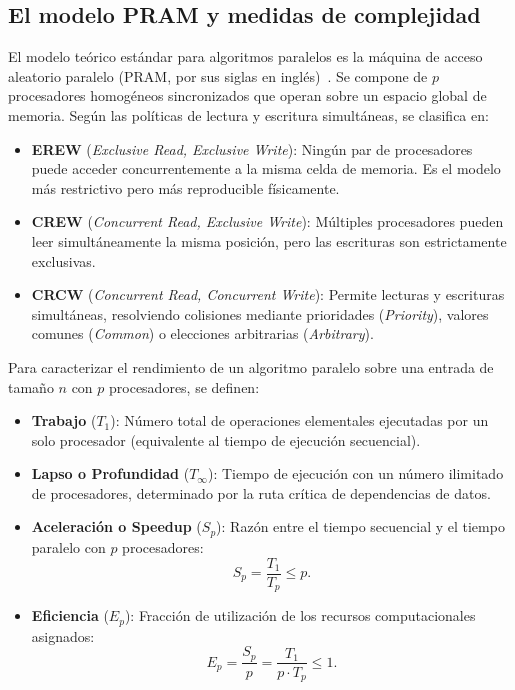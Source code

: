\documentclass[11pt,letterpaper,oneside]{article}
\begin{document}
\subsection{El modelo PRAM y medidas de complejidad}
El modelo teórico estándar para algoritmos paralelos es la máquina de acceso aleatorio paralelo (PRAM, por sus siglas en inglés)~\cite{ja-ja}. Se compone de $p$ procesadores homogéneos sincronizados que operan sobre un espacio global de memoria. Según las políticas de lectura y escritura simultáneas, se clasifica en:
\begin{itemize}
  \item \textbf{EREW} (\emph{Exclusive Read, Exclusive Write}): Ningún par de procesadores puede acceder concurrentemente a la misma celda de memoria. Es el modelo más restrictivo pero más reproducible físicamente.
  \item \textbf{CREW} (\emph{Concurrent Read, Exclusive Write}): Múltiples procesadores pueden leer simultáneamente la misma posición, pero las escrituras son estrictamente exclusivas.
  \item \textbf{CRCW} (\emph{Concurrent Read, Concurrent Write}): Permite lecturas y escrituras simultáneas, resolviendo colisiones mediante prioridades (\emph{Priority}), valores comunes (\emph{Common}) o elecciones arbitrarias (\emph{Arbitrary}).
\end{itemize}

Para caracterizar el rendimiento de un algoritmo paralelo sobre una entrada de tamaño $n$ con $p$ procesadores, se definen:
\begin{itemize}
  \item \textbf{Trabajo} ($T_1$): Número total de operaciones elementales ejecutadas por un solo procesador (equivalente al tiempo de ejecución secuencial).
  \item \textbf{Lapso o Profundidad} ($T_\infty$): Tiempo de ejecución con un número ilimitado de procesadores, determinado por la ruta crítica de dependencias de datos.
  \item \textbf{Aceleración o Speedup} ($S_p$): Razón entre el tiempo secuencial y el tiempo paralelo con $p$ procesadores:
  \begin{equation}
    S_p = \frac{T_1}{T_p} \le p.
    \label{eq:speedup}
  \end{equation}
  \item \textbf{Eficiencia} ($E_p$): Fracción de utilización de los recursos computacionales asignados:
  \begin{equation}
    E_p = \frac{S_p}{p} = \frac{T_1}{p \cdot T_p} \le 1.
    \label{eq:eficiencia}
  \end{equation}
\end{itemize}
\end{document}

